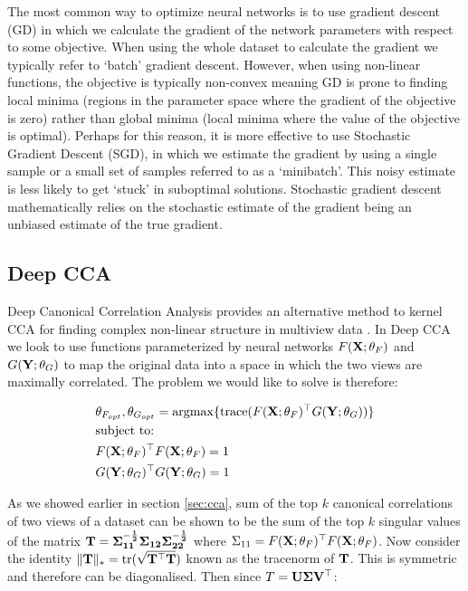 The most common way to optimize neural networks is to use gradient descent (GD) in which we calculate the gradient of the network parameters with respect to some objective. When using the whole dataset to calculate the gradient we typically refer to `batch' gradient descent. However, when using non-linear functions, the objective is typically non-convex meaning GD is prone to finding local minima (regions in the parameter space where the gradient of the objective is zero) rather than global minima (local minima where the value of the objective is optimal). Perhaps for this reason, it is more effective to use Stochastic Gradient Descent (SGD), in which we estimate the gradient by using a single sample or a small set of samples referred to as a `minibatch'. This noisy estimate is less likely to get `stuck' in suboptimal solutions. Stochastic gradient descent mathematically relies on the stochastic estimate of the gradient being an unbiased estimate of the true gradient.

\subsection{Deep CCA}

Deep Canonical Correlation Analysis provides an alternative method to kernel CCA for finding complex non-linear structure in multiview data \cite{andrew2013deep}. In Deep CCA we look to use functions parameterized by neural networks $F(\bold{X};\theta_F)$ and $G(\bold{Y};\theta_G)$ to map the original data into a space in which the two views are maximally correlated. The problem we would like to solve is therefore:

\begin{align}
    & \theta_{F_{opt}},\theta_{G_{opt}}=\mathrm{argmax}\{\text{trace}( F(\bold{X};\theta_F)^{\top}G(\bold{Y};\theta_G))  \}\\
    & \text{subject to:} \notag\\
    & F(\bold{X};\theta_F)^{\top}F(\bold{X};\theta_F)=1 \notag\\
    & G(\bold{Y};\theta_G)^{\top}G(\bold{Y};\theta_G)=1 \notag
\end{align}

As we showed earlier in section \ref{sec:cca}, sum of the top $k$ canonical correlations of two views of a dataset can be shown to be the sum of the top $k$ singular values of the matrix $\bold{T}=\bold{\Sigma_{11}^{-\frac{1}{2}}\Sigma_{12}\Sigma_{22}^{-\frac{1}{2}}}$ where $\Sigma_{11}=F(\bold{X};\theta_F)^{\top}F(\bold{X};\theta_F)$. Now consider the identity $\|\bold{T}\|_*=\text{tr}(\sqrt{\bold{T^{\top}T}})$ known as the tracenorm of $\bold{T}$. This is symmetric and therefore can be diagonalised. Then since $T=\bold{U\Sigma V^{\top}}$:

